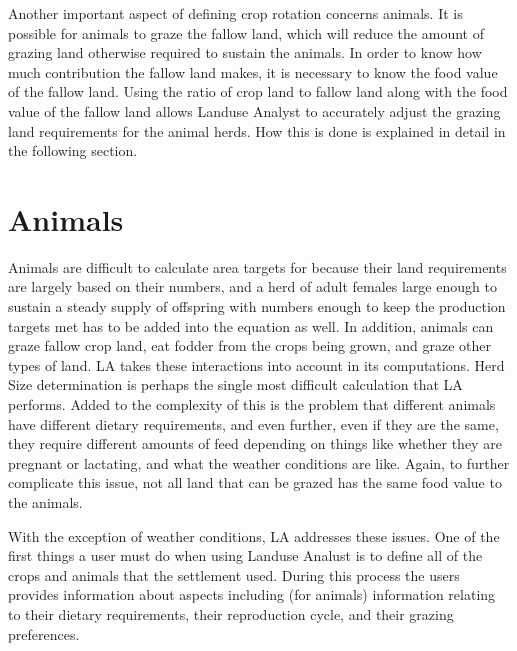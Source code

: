     Another important aspect of defining crop rotation concerns animals.  It is
possible for animals to graze the fallow land, which will reduce the amount of
grazing land otherwise required to sustain the animals.  In order to know how
much contribution the fallow land makes, it is necessary to know the food value
of the fallow land.  Using the ratio of crop land to fallow land along with the
food value of the fallow land allows Landuse Analyst to accurately adjust the
grazing land requirements for the animal herds.  How this is done is explained
in detail in the following section.

\section{Animals}
Animals are difficult to calculate area targets for because their land
requirements are largely based on their numbers, and a herd of adult
females large enough to sustain a steady supply of offspring with numbers
enough to keep the production targets met has to be added into the equation as
well.  In addition, animals can graze fallow crop land, eat fodder from
the crops being grown, and graze other types of land.  LA takes these
interactions into account in its computations.
Herd Size determination is perhaps the single most difficult calculation that
LA performs.  Added to the complexity of this is the problem that different
animals have different dietary requirements, and even further, even if they
are the same, they require different amounts of feed depending on things like
whether they are pregnant or lactating, and what the weather conditions are
like.  Again, to further complicate this issue, not all land that can be
grazed has the same food value to the animals.

With the exception of weather conditions, LA addresses these issues.  One of
the first things a user must do when using Landuse Analust is to define all
of the crops and animals that the settlement used.  During this process the
users provides information about aspects including (for animals) information
relating to their dietary requirements, their reproduction cycle, and their
grazing preferences.  


